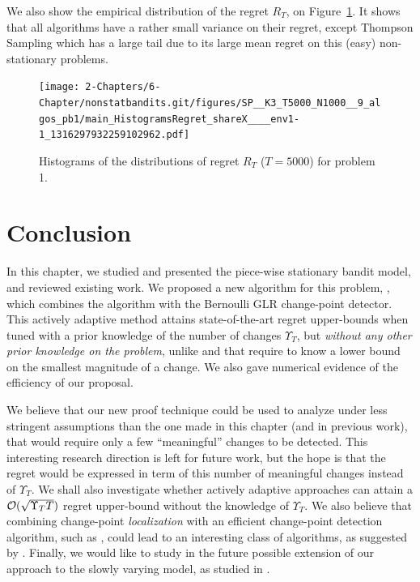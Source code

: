 We also show the empirical distribution of the regret $R_T$, on Figure~\ref{fig:6:histogramRegretPb1}. It shows that all algorithms have a rather small variance on their regret, except Thompson Sampling which has a large tail due to its large mean regret on this (easy) non-stationary problems.

\begin{figure}[h!]  %
    \centering
    \texttt{[image: 2-Chapters/6-Chapter/nonstatbandits.git/figures/SP\_\_K3\_T5000\_N1000\_\_9\_algos\_pb1/main\_HistogramsRegret\_shareX\_\_\_\_env1-1\_1316297932259102962.pdf]}
    \caption{Histograms of the distributions of regret $R_T$ ($T=5000$) for problem 1.}
    \label{fig:6:histogramRegretPb1}
\end{figure}


\newpage
\section{Conclusion}
\label{sub:6:conclusion}

In this chapter, we studied and presented the piece-wise stationary bandit model, and reviewed existing work.
%
We proposed a new algorithm for this problem, \GLRklUCB, which combines the \klUCB{} algorithm with the Bernoulli GLR change-point detector. This actively adaptive method attains state-of-the-art regret upper-bounds when tuned with a prior knowledge of the number of changes $\Upsilon_T$, but \emph{without any other prior knowledge on the problem}, unlike \CUSUMUCB{} and \MUCB{} that require to know a lower bound on the smallest magnitude of a change. We also gave numerical evidence of the efficiency of our proposal.

We believe that our new proof technique could be used to analyze \GLRklUCB{} under less stringent assumptions than the one made in this chapter (and in previous work), that would require only a few ``meaningful'' changes to be detected. This interesting research direction is left for future work,  but the hope is that the regret would be expressed in term of this number of meaningful changes instead of $\Upsilon_T$. We shall also investigate whether actively adaptive approaches can attain a $\mathcal{O}(\sqrt{\Upsilon_T T})$ regret upper-bound without the knowledge of $\Upsilon_T$.
We also believe that combining change-point \emph{localization} with an efficient change-point detection algorithm, such as \GLRklUCB, could lead to an interesting class of algorithms, as suggested by \cite{Maillard2018GLR}.
Finally, we would like to study in the future possible extension of our approach to the slowly varying model, as studied in \cite{Besbes14stochastic,WeiSrivastava18Abruptly}.

